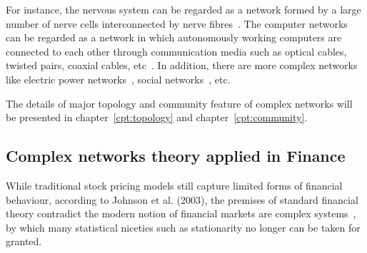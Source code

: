 For instance, the nervous system can be regarded as a network formed by a large number of nerve cells interconnected by nerve fibres~\cite{watts1998collective}. The computer networks can be regarded as a network in which autonomously working computers are connected to each other through communication media such as optical cables, twisted pairs, coaxial cables, etc~\cite{watts1998collective}. In addition, there are more complex networks like electric power networks~\cite{faloutsos1999power}, social networks~\cite{watts1998collective, hofman2017prediction, ebel2002scale}, etc.


The details of major topology and community feature of complex networks will be presented in chapter~\ref{cpt:topology} and chapter~\ref{cpt:community}.

\subsection{Complex networks theory applied in Finance}
While traditional stock pricing models still capture limited forms of financial behaviour, according to Johnson et al. (2003), the premises of standard financial theory contradict the modern notion of financial markets are complex systems~\cite{financialcomplex}, by which many statistical niceties such as stationarity no longer can be taken for granted.

